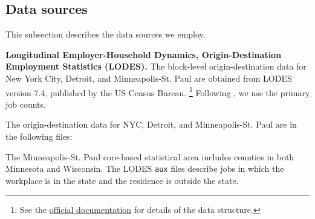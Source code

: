 \documentclass[11pt]{article}
\theoremstyle{definition}
\begin{document}
\subsection{Data sources} \label{sec:data_sources}

This subsection describes the data sources we employ.

\noindent \textbf{Longitudinal Employer-Household Dynamics, Origin-Destination Employment Statistics (LODES).} 
The block-level origin-destination data for New York City, Detroit, and Minneapolis-St. Paul are 
obtained from LODES version 7.4, 
published by the US Census Bureau.%
\footnote{See the
\href{https://lehd.ces.census.gov/data/lodes/LODES7/LODESTechDoc7.4.pdf}{official documentation} 
for details of the data structure.}
Following , we use the primary job counts.

The origin-destination data for NYC, Detroit, and Minneapolis-St. Paul are in the following files:

\begin{center}
\end{center}
The Minneapolis-St. Paul core-based statistical area includes counties in both Minnesota and Wisconsin.
The LODES \texttt{aux} files describe jobs in which the workplace is in the state and the residence is outside the state.
\end{document}
